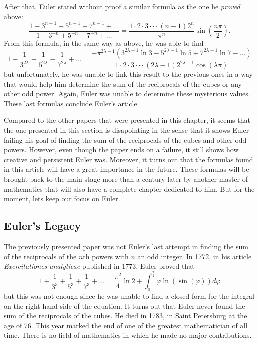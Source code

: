 After that, Euler stated without proof a similar formula as the one he \textit{proved} above:
\begin{equation} \label{curious ratio 2}
    \boxed{\frac{1 - 3^{n-1} + 5^{n-1} - 7^{n-1} + \dots}{1 - 3^{-n} + 5^{-n} - 7^{-n} + \dots} = \frac{1 \cdot 2 \cdot 3 \cdot \cdot \cdot (n-1) 2^n}{\pi^n}\sin\left(\frac{n\pi}{2}\right).}
\end{equation}
From this formula, in the same way as above, he was able to find
$$1 - \frac{1}{3^{2\lambda}} + \frac{1}{5^{2\lambda}} - \frac{1}{7^{2\lambda}} + \dots = \frac{-\pi^{2\lambda - 1}(3^{2\lambda - 1}\ln 3 - 5^{2\lambda - 1}\ln 5 + 7^{2\lambda - 1}\ln 7- \dots)}{1 \cdot 2 \cdot 3 \cdot \cdot \cdot (2 \lambda - 1)2^{2\lambda - 1}\cos(\lambda \pi)}$$
but unfortunately, he was unable to link this result to the previous ones in a way that would help him determine the sum of the reciprocals of the cubes or any other odd power. Again, Euler was unable to determine these mysterious values. These last formulas conclude Euler's article.

Compared to the other papers that were presented in this chapter, it seems that the one presented in this section is disapointing in the sense that it shows Euler failing his goal of finding the sum of the reciprocals of the cubes and other odd powers. However, even though the paper ends on a failure, it still shows how creative and persistent Euler was. Moreover, it turns out that the formulas found in this article will have a great importance in the future. These formulas will be brought back to the main stage more than a century later by another master of mathematics that will also have a complete chapter dedicated to him. But for the moment, lets keep our focus on Euler.

\subsection*{Euler's Legacy}

The previously presented paper was not Euler's last attempt in finding the sum of the reciprocals of the $n$th powers with $n$ an odd integer. In 1772, in his article \textit{Exercitationes analyticae} \cite{eulerE432} published in 1773, Euler proved that
$$1 + \frac{1}{3^3} + \frac{1}{5^3} + \frac{1}{7^3} + \dots = \frac{\pi^2}{4}\ln 2 + \int_{0}^{\frac{\pi}{2}}\varphi \ln(\sin(\varphi))d\varphi$$
but this was not enough since he was unable to find a closed form for the integral on the right hand side of the equation. It turns out that Euler never found the sum of the reciprocals of the cubes. He died in 1783, in Saint Petersburg at the age of 76. This year marked the end of one of the greatest mathematician of all time. There is no field of mathematics in which he made no major contributions. 

